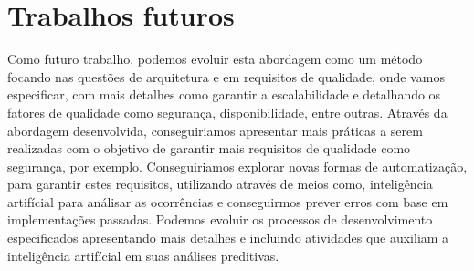   \chapter{Trabalhos futuros}
    Como futuro trabalho, podemos evoluir esta abordagem como um método focando
    nas questões de arquitetura e em requisitos de qualidade, onde vamos especificar,
    com mais detalhes como garantir a escalabilidade e detalhando os fatores de
    qualidade como segurança, disponibilidade, entre outras. Através da abordagem
    desenvolvida, conseguiriamos apresentar mais práticas a serem realizadas com
    o objetivo de garantir mais requisitos de qualidade como segurança, por exemplo.
    Conseguiriamos explorar novas formas de automatização, para garantir estes
    requisitos, utilizando através de meios como, inteligência artifícial para
    análisar as ocorrências e conseguirmos prever erros com base em implementações
    passadas. Podemos evoluir os processos de desenvolvimento especificados
    apresentando mais detalhes e incluindo atividades que auxiliam a inteligência
    artifícial em suas análises preditivas.
